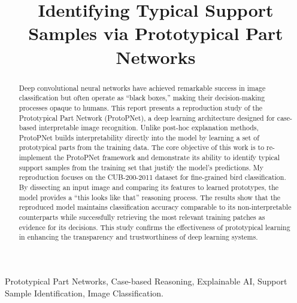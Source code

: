 \documentclass[conference]{IEEEtran}
\begin{document}
\title{Identifying Typical Support Samples via Prototypical Part Networks}

\author{
}

\maketitle

\begin{abstract}
Deep convolutional neural networks have achieved remarkable success in image classification but often operate as ``black boxes,'' making their decision-making processes opaque to humans. This report presents a reproduction study of the Prototypical Part Network (ProtoPNet), a deep learning architecture designed for case-based interpretable image recognition. Unlike post-hoc explanation methods, ProtoPNet builds interpretability directly into the model by learning a set of prototypical parts from the training data. The core objective of this work is to re-implement the ProtoPNet framework and demonstrate its ability to identify typical support samples from the training set that justify the model’s predictions. My reproduction focuses on the CUB-200-2011 dataset for fine-grained bird classification. By dissecting an input image and comparing its features to learned prototypes, the model provides a ``this looks like that'' reasoning process. The results show that the reproduced model maintains classification accuracy comparable to its non-interpretable counterparts while successfully retrieving the most relevant training patches as evidence for its decisions. This study confirms the effectiveness of prototypical learning in enhancing the transparency and trustworthiness of deep learning systems.
\end{abstract}

\begin{IEEEkeywords}
Prototypical Part Networks, Case-based Reasoning, Explainable AI, Support Sample Identification, Image Classification.
\end{IEEEkeywords}
\end{document}

